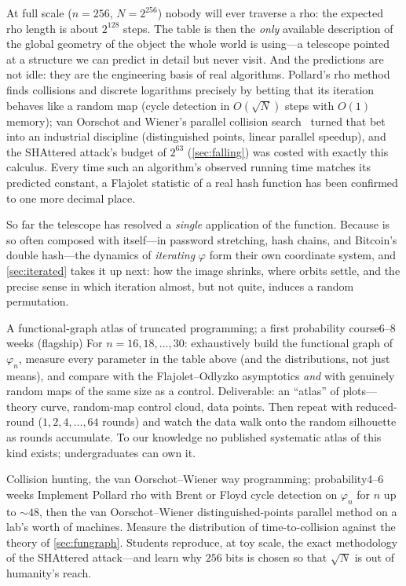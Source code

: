 At full scale ($n = 256$, $N = 2^{256}$) nobody will ever traverse a rho:
the expected rho length is about $2^{128}$ steps. The table is then the
\emph{only} available description of the global geometry of the object the
whole world is using---a telescope pointed at a structure we can predict
in detail but never visit. And the predictions are not idle: they are the
engineering basis of real algorithms. Pollard's rho
method~\citep{Pollard1978} finds collisions and discrete logarithms
precisely by betting that its iteration behaves like a random map (cycle
detection in $O(\sqrt{N})$ steps with $O(1)$ memory); van Oorschot and
Wiener's parallel collision search~\citep{vanOorschotWiener1999} turned
that bet into an industrial discipline (distinguished points, linear
parallel speedup), and the SHAttered attack's budget of $2^{63}$
(\cref{sec:falling}) was costed with exactly this calculus. Every time
such an algorithm's observed running time matches its predicted constant,
a Flajolet statistic of a real hash function has been confirmed to one
more decimal place.

So far the telescope has resolved a \emph{single} application of the
function. Because \SHA{} is so often composed with itself---in password
stretching, hash chains, and Bitcoin's double hash---the dynamics of
\emph{iterating} $\varphi$ form their own coordinate system, and
\cref{sec:iterated} takes it up next: how the image shrinks, where
orbits settle, and the precise sense in which iteration almost, but not
quite, induces a random permutation.

\begin{project}{A functional-graph atlas of truncated \SHA{}}
  {programming; a first probability course}{6--8 weeks (flagship)}
  For $n = 16, 18, \dots, 30$: exhaustively build the functional graph of
  $\varphi_n$, measure every parameter in the table above (and the
  distributions, not just means), and compare with the
  Flajolet--Odlyzko asymptotics \emph{and} with genuinely random maps of
  the same size as a control. Deliverable: an ``atlas'' of plots---theory
  curve, random-map control cloud, \SHA{} data points. Then repeat with
  reduced-round \SHA{} ($1, 2, 4, \dots, 64$ rounds) and watch the data
  walk onto the random silhouette as rounds accumulate. To our knowledge
  no published systematic atlas of this kind exists; undergraduates can
  own it.
\end{project}

\begin{project}{Collision hunting, the van Oorschot--Wiener way}
  {programming; probability}{4--6 weeks}
  Implement Pollard rho with Brent or Floyd cycle detection on
  $\varphi_n$ for $n$ up to ${\sim}48$, then the van Oorschot--Wiener
  distinguished-points parallel method on a lab's worth of machines. Measure the distribution of time-to-collision against the
  theory of \cref{sec:fungraph}. Students reproduce, at toy scale, the
  exact methodology of the SHAttered attack---and learn why $256$ bits is
  chosen so that $\sqrt{N}$ is out of humanity's reach.
\end{project}

